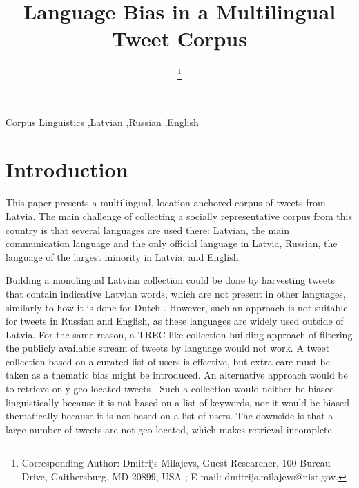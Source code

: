 \documentclass{IOS-Book-Article}
\begin{document}
\begin{frontmatter}              %

\title{Language Bias in a Multilingual Tweet Corpus}

\author[A]{ %
  \thanks{Corresponding Author: Dmitrijs Milajevs, Guest Researcher,
    100 Bureau Drive,
    Gaithersburg, MD 20899, USA%
    ;
    E-mail: dmitrijs.milajevs@nist.gov.}}


\address[A]{Guest Researcher at National Institute of Standards and Technology, Maryland, USA}

%

\begin{keyword}
Corpus Linguistics \sep Latvian \sep Russian \sep English
\end{keyword}
\end{frontmatter}

\thispagestyle{empty}
\pagestyle{empty}

\section*{Introduction}

This paper presents a multilingual, location-anchored corpus of tweets from Latvia. The main challenge of collecting a socially representative corpus from this country is that several languages are used there: Latvian, the main communication language and the only official language in Latvia, Russian, the language of the largest minority in Latvia, and English.

%
Building a monolingual Latvian collection could be done by harvesting tweets that contain indicative Latvian words, which are not present in other languages, similarly to how it is done for Dutch \cite{sang2013}. However, such an approach is not suitable for tweets in Russian and English, as these languages are widely used outside of Latvia.
%
For the same reason, a TREC-like collection building approach \cite{lin2017rts} of filtering the publicly available stream of tweets by language would not work.
%
A tweet collection based on a curated list of users \cite{SANVICENTE16.465,L14-1642} is effective, but extra care must be taken as a thematic bias might be introduced.
%
An alternative approach would be to retrieve only geo-located tweets \cite{coats_steven_2017,milajevs:2017:BUCC}. Such a collection would neither be biased linguistically because it is not based on a list of keywords, nor it would be biased thematically because it is not based on a list of users. The downside is that a large number of tweets are not geo-located, which makes retrieval incomplete.
\end{document}
